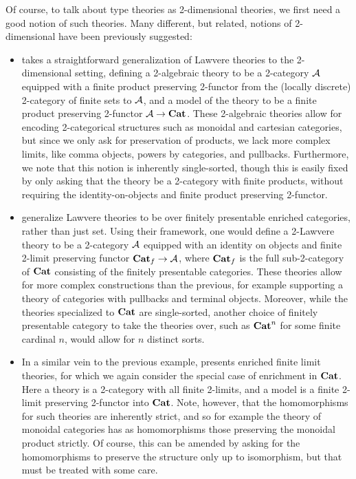 \documentclass[../thesis.tex]{subfiles}
\begin{document}
Of course, to talk about type theories as 2-dimensional theories, we first need a good notion of such theories. Many different,
but related, notions of 2-dimensional have been previously suggested:
\begin{itemize}
  \item \textcite{gray1973} takes a straightforward generalization of Lawvere theories to the 2-dimensional setting, defining
    a 2-algebraic theory to be a 2-category ${\mathcal{A}}$ equipped with a finite product preserving 2-functor from the (locally
    discrete) 2-category of finite sets to ${\mathcal{A}}$, and a model of the theory to be a finite product preserving 2-functor
    ${\mathcal{A}} \to {\mathbf{Cat}}$. These 2-algebraic theories allow for encoding 2-categorical structures such as monoidal and cartesian
    categories, but since we only ask for preservation of products, we lack more complex limits, like comma objects, powers
    by categories, and pullbacks. Furthermore, we note that this notion is inherently single-sorted, though this is easily
    fixed by only asking that the theory be a 2-category with finite products, without requiring the identity-on-objects
    and finite product preserving 2-functor.

  \item \textcite{nishizawa2009} generalize Lawvere theories to be over finitely presentable enriched categories, rather than
    just set. Using their framework, one would define a 2-Lawvere theory to be a 2-category ${\mathcal{A}}$ equipped with an identity
    on objects and finite 2-limit preserving functor ${\mathbf{Cat}}_f \to {\mathcal{A}}$, where ${\mathbf{Cat}}_f$ is the full sub-2-category of ${\mathbf{Cat}}$
    consisting of the finitely presentable categories. These theories allow for more complex constructions than the previous,
    for example supporting a theory of categories with pullbacks and terminal objects. Moreover, while the theories specialized
    to ${\mathbf{Cat}}$ are single-sorted, another choice of finitely presentable category to take the theories over, such as ${\mathbf{Cat}}^n$
    for some finite cardinal $n$, would allow for $n$ distinct sorts.

  \item In a similar vein to the previous example, \textcite{kelly1982a} presents enriched finite limit theories, for which
    we again consider the special case of enrichment in ${\mathbf{Cat}}$. Here a theory is a 2-category with all finite 2-limits, and
    a model is a finite 2-limit preserving 2-functor into ${\mathbf{Cat}}$. Note, however, that the homomorphisms for such theories are
    inherently strict, and so for example the theory of monoidal categories has as homomorphisms those preserving the monoidal
    product strictly. Of course, this can be amended by asking for the homomorphisms to preserve the structure only up to
    isomorphism, but that must be treated with some care.


\end{itemize}
\end{document}
